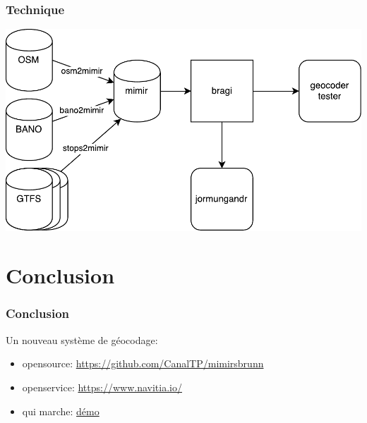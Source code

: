 \documentclass[table]{beamer}
\begin{document}
\begin{frame}
  \frametitle{Technique}

  \centering
  \includegraphics[width=\linewidth]{images/mimirsbrunn}
\end{frame}

\section{Conclusion}

\begin{frame}
  \frametitle{Conclusion}

  Un nouveau système de géocodage:
  \begin{itemize}
  \item opensource: \url{https://github.com/CanalTP/mimirsbrunn}
  \item openservice: \url{https://www.navitia.io/}
  \item qui marche: \href{http://canaltp.github.io/navitia-playground/play.html?request=https\%3A\%2F\%2Fapi.navitia.io\%2Fv1\%2Fplaces\%3Fq\%3D20\%2520hec\%2520mal\%26from\%3D2.364391\%253B48.866436\%26&token=4e5c-bf9d-4fc9-8a60-d47fb98b1b0e}{démo}
  \end{itemize}
\end{frame}

\begin{frame}
  \titlepage
\end{frame}
\end{document}

